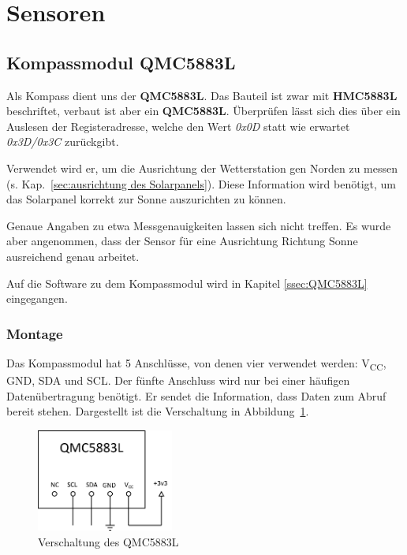 \section{Sensoren}\label{sec:Sensoren}




\subsection{Kompassmodul QMC5883L}

Als Kompass dient uns der \textbf{QMC5883L}. Das Bauteil ist zwar mit \textbf{HMC5883L} beschriftet, verbaut ist aber ein \textbf{QMC5883L}. Überprüfen lässt sich dies über ein Auslesen der Registeradresse, welche den Wert \textit{0x0D} statt wie erwartet \textit{0x3D/0x3C} zurückgibt.

Verwendet wird er, um die Ausrichtung der Wetterstation gen Norden zu messen (s. Kap.~\ref{sec:ausrichtung des Solarpanels}). Diese Information wird benötigt, um das Solarpanel korrekt zur Sonne auszurichten zu können. 

Genaue Angaben zu etwa Messgenauigkeiten lassen sich nicht treffen. Es wurde aber angenommen, dass der Sensor für eine Ausrichtung Richtung Sonne ausreichend genau arbeitet.

Auf die Software zu dem Kompassmodul wird in Kapitel \ref{ssec:QMC5883L} eingegangen.

\subsubsection{Montage}

Das Kompassmodul hat 5 Anschlüsse, von denen vier verwendet werden: V\textsubscript{CC}, GND, SDA und SCL. Der fünfte Anschluss wird nur bei einer häufigen Datenübertragung benötigt. Er sendet die Information, dass Daten zum Abruf bereit stehen. Dargestellt ist die Verschaltung in Abbildung~\ref{fig:QMC5883L_Plan}.

\begin{figure}[H]
  \centering
  \includegraphics[width=0.4\textwidth]{./img/QMC5883L_Plan.png}
  \caption{Verschaltung des QMC5883L}\label{fig:QMC5883L_Plan}
\end{figure}

